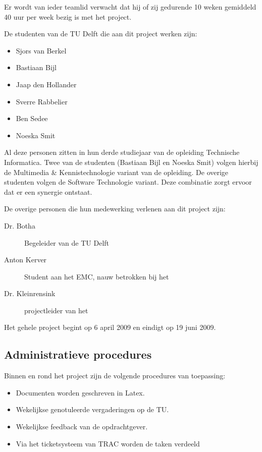 Er wordt van ieder teamlid verwacht dat hij of zij gedurende 10 weken gemiddeld 40 uur per week bezig is met het project.

De studenten van de TU Delft die aan dit project werken zijn:
\begin{itemize}
	\item Sjors van Berkel 
	\item Bastiaan Bijl
	\item Jaap den Hollander
	\item Sverre Rabbelier
	\item Ben Sedee
	\item Noeska Smit
\end{itemize}
Al deze personen zitten in hun derde studiejaar van de opleiding Technische Informatica. Twee van de studenten (Bastiaan Bijl en Noeska Smit) volgen hierbij de Multimedia \& Kennistechnologie variant van de opleiding. De overige studenten volgen de Software Technologie variant. Deze combinatie zorgt ervoor dat er een synergie ontstaat.


De overige personen die hun medewerking verlenen aan dit project zijn:
\begin{description}
	\item[Dr. Botha] Begeleider van de TU Delft
	\item[Anton Kerver] Student aan het EMC, nauw betrokken bij het \casamproject
	\item[Dr. Kleinrensink] projectleider van het \casamproject
\end{description}
Het gehele project begint op 6 april 2009 en eindigt op 19 juni 2009.

\subsection{Administratieve procedures}

Binnen en rond het project zijn de volgende procedures van toepassing:

\begin{itemize}
    \item Documenten worden geschreven in Latex.
    \item Wekelijkse genotuleerde vergaderingen op de TU.
    \item Wekelijkse feedback van de opdrachtgever.
    \item Via het ticketsysteem van TRAC\cite{trac} worden de taken verdeeld
\end{itemize}

